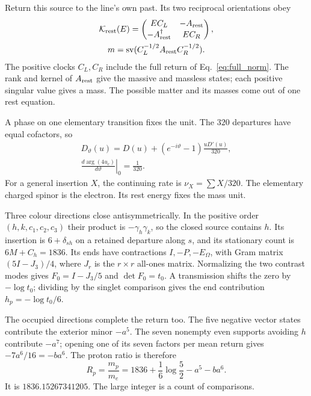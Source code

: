 \documentclass[aps,prx,reprint,longbibliography]{revtex4-2}
\begin{document}
Return this source to the line's own past. Its two reciprocal orientations obey
\begin{equation}
\begin{gathered}
 \mathcal K_{\rm rest}(E)=
 \begin{pmatrix}EC_L&-A_{\rm rest}\\-A_{\rm rest}^\dagger&EC_R\end{pmatrix},\\
 m=\operatorname{sv}(C_L^{-1/2}A_{\rm rest}C_R^{-1/2}).
 \end{gathered}
 \label{eq:rest_kernel}
\end{equation}
The positive clocks $C_L,C_R$ include the full return of Eq.~\eqref{eq:full_norm}. The rank and kernel of $A_{\rm rest}$ give the massive and massless states; each positive singular value gives a mass. The possible matter and its masses come out of one rest equation.

A phase on one elementary transition fixes the unit. The $320$ departures have equal cofactors, so
\begin{equation}
\begin{gathered}
 D_\vartheta(u)=D(u)+(e^{-i\vartheta}-1)\frac{uD'(u)}{320},\\
 \left.\frac{d\arg(4u_c)}{d\vartheta}\right|_0=\frac1{320}.
 \end{gathered}
 \label{eq:electron_mark}
\end{equation}
For a general insertion $X$, the continuing rate is $\nu_X=\sum X/320$. The elementary charged spinor is the electron. Its rest energy fixes the mass unit.

Three colour directions close antisymmetrically. In the positive order $(h,k,c_1,c_2,c_3)$ their product is $-\gamma_h\gamma_k$, so the closed source contains $h$. Its insertion is $6+\delta_{sh}$ on a retained departure along $s$, and its stationary count is $6M+C_h=1836$. Its ends have contractions $I,-P,-E_\Omega$, with Gram matrix $(5I-J_3)/4$, where $J_r$ is the $r\times r$ all-ones matrix. Normalizing the two contrast modes gives $F_0=I-J_3/5$ and $\det F_0=t_0$. A transmission shifts the zero by $-\log t_0$; dividing by the singlet comparison gives the end contribution $h_p=-\log t_0/6$.

The occupied directions complete the return too. The five negative vector states contribute the exterior minor $-a^5$. The seven nonempty even supports avoiding $h$ contribute $-a^7$; opening one of its seven factors per mean return gives $-7a^6/16=-ba^6$. The proton ratio is therefore
\begin{equation}
 \boxed{R_p=\frac{m_p}{m_e}
 =1836+\frac16\log\frac52-a^5-ba^6}.
 \label{eq:Rp}
\end{equation}
It is $1836.15267341205$. The large integer is a count of comparisons.
\end{document}
